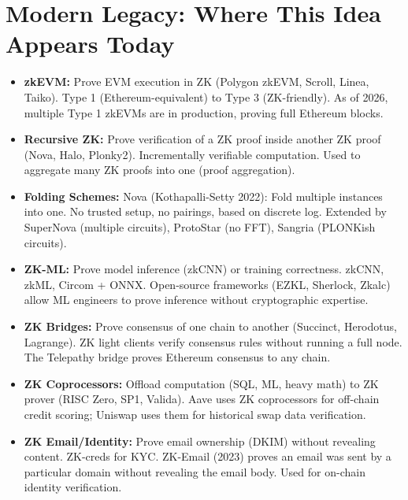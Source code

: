 \section{Modern Legacy: Where This Idea Appears Today}
\label{sec:zk:legacy}

\begin{itemize}
\item \textbf{zkEVM:} Prove EVM execution in ZK (Polygon zkEVM, Scroll, Linea, Taiko). Type 1 (Ethereum-equivalent) to Type 3 (ZK-friendly). As of 2026, multiple Type 1 zkEVMs are in production, proving full Ethereum blocks.

\item \textbf{Recursive ZK:} Prove verification of a ZK proof inside another ZK proof (Nova, Halo, Plonky2). Incrementally verifiable computation. Used to aggregate many ZK proofs into one (proof aggregation).

\item \textbf{Folding Schemes:} Nova (Kothapalli-Setty 2022): Fold multiple instances into one. No trusted setup, no pairings, based on discrete log. Extended by SuperNova (multiple circuits), ProtoStar (no FFT), Sangria (PLONKish circuits).

\item \textbf{ZK-ML:} Prove model inference (zkCNN) or training correctness. zkCNN, zkML, Circom + ONNX. Open-source frameworks (EZKL, Sherlock, Zkalc) allow ML engineers to prove inference without cryptographic expertise.

\item \textbf{ZK Bridges:} Prove consensus of one chain to another (Succinct, Herodotus, Lagrange). ZK light clients verify consensus rules without running a full node. The Telepathy bridge proves Ethereum consensus to any chain.

\item \textbf{ZK Coprocessors:} Offload computation (SQL, ML, heavy math) to ZK prover (RISC Zero, SP1, Valida). Aave uses ZK coprocessors for off-chain credit scoring; Uniswap uses them for historical swap data verification.

\item \textbf{ZK Email/Identity:} Prove email ownership (DKIM) without revealing content. ZK-creds for KYC. ZK-Email (2023) proves an email was sent by a particular domain without revealing the email body. Used for on-chain identity verification.


\end{itemize}
